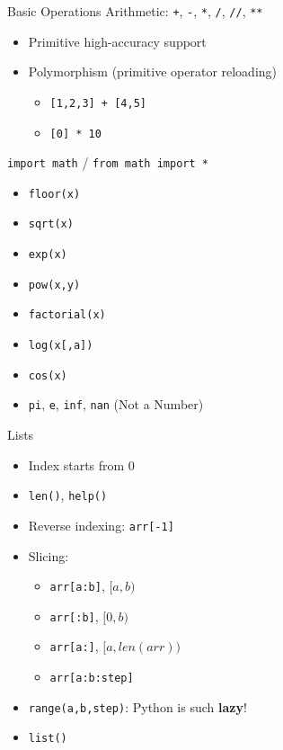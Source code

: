 \documentclass{../TexTemplate/myslide}
\begin{document}
\begin{frame}[fragile]{Basic Operations}
Arithmetic: \verb'+', \verb'-', \verb'*', \verb'/', \verb'//', \verb'**'
\begin{itemize}
	\item Primitive high-accuracy support
	\item Polymorphism (primitive operator reloading)
	\begin{itemize}
		\item \verb'[1,2,3] + [4,5]'
		\item \verb'[0] * 10'
	\end{itemize}
\end{itemize}
\pause
\verb'import math' / \verb'from math import *'
\begin{itemize}
	\item \verb'floor(x)'
	\item \verb'sqrt(x)'
	\item \verb'exp(x)'
	\item \verb'pow(x,y)'
	\item \verb'factorial(x)'
	\item \verb'log(x[,a])'
	\item \verb'cos(x)'
	\item \verb'pi', \verb'e', \verb'inf', \verb'nan' (Not a Number)
\end{itemize}
\end{frame}

\begin{frame}[fragile]{Lists}
\begin{itemize}
	\item Index starts from 0
	\item \verb'len()', \verb'help()'
	\item Reverse indexing: \verb'arr[-1]'
	\item Slicing:
	\begin{itemize}
		\item \verb'arr[a:b]', $[a,b)$
		\item \verb'arr[:b]', $[0,b)$
		\item \verb'arr[a:]', $[a,len(arr))$
		\item \verb'arr[a:b:step]'
	\end{itemize}
	\item \verb'range(a,b,step)': Python is such \textbf{lazy}!
	\item \verb'list()'
\end{itemize}
\end{frame}
\end{document}
